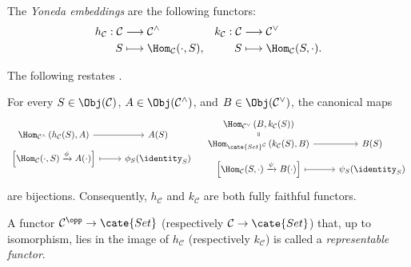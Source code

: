 The \emph{Yoneda embeddings} are the following functors:
\begin{align*}
	h_{\mathcal{C}}: \mathcal{C} & \longrightarrow \mathcal{C}^\wedge & k_{\mathcal{C}}: \mathcal{C} & \longrightarrow \mathcal{C}^\vee \\
	S & \longmapsto \Hom_{\mathcal{C}}(\cdot, S), & S & \longmapsto \Hom_{\mathcal{C}}(S, \cdot).
\end{align*}

The following restates \cite[Theorem 2.5.1]{Li1}.

\begin{theorem}\label{prop:Yoneda}
	For every $S\in\Obj(\mathcal{C})$, $A\in\Obj(\mathcal{C}^\wedge)$, and $B\in\Obj(\mathcal{C}^\vee)$, the canonical maps
	\[\begin{tikzcd}[row sep=tiny]
		\Hom_{\mathcal{C}^\wedge}\left(h_{\mathcal{C}}(S), A \right) \arrow[r] & A(S) \\
		{\left[ \Hom_{\mathcal{C}}(\cdot, S) \xrightarrow{\phi} A(\cdot) \right]} \arrow[mapsto, r] & \phi_S(\identity_S)
	\end{tikzcd} \quad \begin{tikzcd}[row sep=tiny]
		\Hom_{\mathcal{C}^\vee}\left(B, k_{\mathcal{C}}(S) \right) \arrow[equal, d] & \\
		\Hom_{\cate{Set}^{\mathcal{C}}}\left(k_{\mathcal{C}}(S), B \right) \arrow[r] & B(S) \\
		{\left[ \Hom_{\mathcal{C}}(S, \cdot) \xrightarrow{\psi} B(\cdot) \right]} \arrow[mapsto, r] & \psi_S(\identity_S)
	\end{tikzcd}\]
	are bijections. Consequently, $h_{\mathcal{C}}$ and $k_{\mathcal{C}}$ are both fully faithful functors.
\end{theorem}

\begin{definition}\label{def:representable-functor}
	A functor $\mathcal{C}^{\opp}\to\cate{Set}$ (respectively $\mathcal{C}\to\cate{Set}$) that, up to isomorphism, lies in the image of $h_{\mathcal{C}}$ (respectively $k_{\mathcal{C}}$) is called a \emph{representable functor}.
\end{definition}

